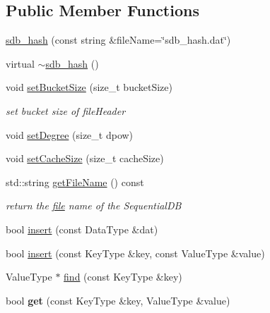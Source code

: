 \subsection*{Public Member Functions}
\begin{CompactItemize}
\item 
\hyperlink{classsdb__hash_02cd69cf8f60ae7f8661b1499d49c453}{sdb\_\-hash} (const string \&fileName=\char`\"{}sdb\_\-hash.dat\char`\"{})
\item 
virtual \hyperlink{classsdb__hash_607bf8eee5de43ee297a5e7ef7c0f56d}{$\sim$sdb\_\-hash} ()
\item 
void \hyperlink{classsdb__hash_e56dbe504c8ae570e59a0571f8099b19}{setBucketSize} (size\_\-t bucketSize)
\begin{CompactList}\small\item\em set bucket size of fileHeader \item\end{CompactList}\item 
void \hyperlink{classsdb__hash_50342daffbd37c85755e4f00f11fdf95}{setDegree} (size\_\-t dpow)
\item 
void \hyperlink{classsdb__hash_f6a720d37fabe2b8a8e8bfcd161c2663}{setCacheSize} (size\_\-t cacheSize)
\item 
\hypertarget{classsdb__hash_18d959e4e8bd201f362b8262f6e37716}{
std::string \hyperlink{classsdb__hash_18d959e4e8bd201f362b8262f6e37716}{getFileName} () const }
\label{classsdb__hash_18d959e4e8bd201f362b8262f6e37716}

\begin{CompactList}\small\item\em return the \hyperlink{classfile}{file} name of the SequentialDB \item\end{CompactList}\item 
bool \hyperlink{classsdb__hash_17c82560d424f1d3519e0b4788fd8ef2}{insert} (const DataType \&dat)
\item 
bool \hyperlink{classsdb__hash_4cd4dcd9d599a843b63d7dda5275131f}{insert} (const KeyType \&key, const ValueType \&value)
\item 
ValueType $\ast$ \hyperlink{classsdb__hash_9f39e15dd1c45b2b78b508df26c69568}{find} (const KeyType \&key)
\item 
\hypertarget{classsdb__hash_bd27b5d38ef142e6f2a89733a1213a64}{
bool \textbf{get} (const KeyType \&key, ValueType \&value)}
\label{classsdb__hash_bd27b5d38ef142e6f2a89733a1213a64}


\end{CompactItemize}
